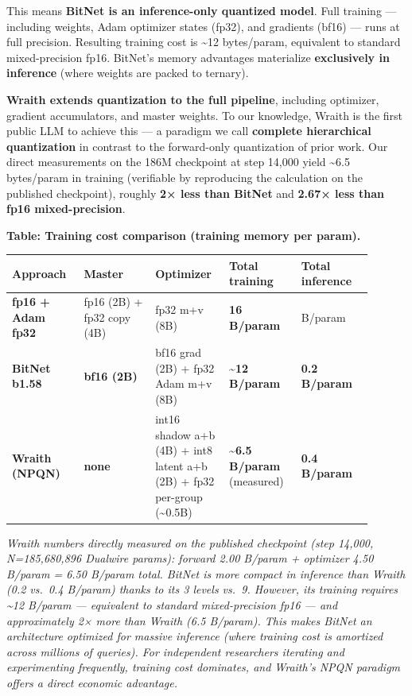This means \textbf{BitNet is an inference-only quantized model}. Full
training --- including weights, Adam optimizer states (fp32), and
gradients (bf16) --- runs at full precision. Resulting training cost is
\textasciitilde12 bytes/param, equivalent to standard mixed-precision
fp16. BitNet's memory advantages materialize \textbf{exclusively in
inference} (where weights are packed to ternary).

\textbf{Wraith extends quantization to the full pipeline}, including
optimizer, gradient accumulators, and master weights. To our knowledge,
Wraith is the first public LLM to achieve this --- a paradigm we call
\textbf{complete hierarchical quantization} in contrast to the
forward-only quantization of prior work. Our direct measurements on the
186M checkpoint at step 14,000 yield \textasciitilde6.5 bytes/param in
training (verifiable by reproducing the calculation on the published
checkpoint), roughly \textbf{2× less than BitNet} and \textbf{2.67× less
than fp16 mixed-precision}.

\textbf{Table: Training cost comparison (training memory per param).}

{\def\LTcaptype{none} %
{\footnotesize\setlength{\tabcolsep}{3pt}
\begin{longtable}[]{@{}>{\raggedright\arraybackslash}p{0.180\linewidth}>{\raggedright\arraybackslash}p{0.180\linewidth}>{\raggedright\arraybackslash}p{0.180\linewidth}>{\raggedright\arraybackslash}p{0.180\linewidth}>{\raggedright\arraybackslash}p{0.180\linewidth}@{}}
\toprule\noalign{}
Approach & Master & Optimizer & Total training & Total inference \\
\midrule\noalign{}
\endhead
\bottomrule\noalign{}
\endlastfoot
\textbf{fp16 + Adam fp32} & fp16 (2B) + fp32 copy (4B) & fp32 m+v (8B) &
\textbf{16 B/param} & 2 B/param \\
\textbf{BitNet b1.58} & \textbf{bf16 (2B)} & bf16 grad (2B) + fp32 Adam
m+v (8B) & \textbf{\textasciitilde12 B/param} & \textbf{0.2 B/param} \\
\textbf{Wraith (NPQN)} & \textbf{none} & int16 shadow a+b (4B) + int8
latent a+b (2B) + fp32 per-group (\textasciitilde0.5B) &
\textbf{\textasciitilde6.5 B/param} (measured) & \textbf{0.4 B/param} \\
\end{longtable}
}
}

\emph{Wraith numbers directly measured on the published checkpoint (step
14,000, N=185,680,896 Dualwire params): forward 2.00 B/param + optimizer
4.50 B/param = 6.50 B/param total. BitNet is more compact in inference
than Wraith (0.2 vs.~0.4 B/param) thanks to its 3 levels vs.~9. However,
its training requires \textasciitilde12 B/param --- equivalent to
standard mixed-precision fp16 --- and approximately 2× more than Wraith
(6.5 B/param). This makes BitNet an architecture optimized for massive
inference (where training cost is amortized across millions of queries).
For independent researchers iterating and experimenting frequently,
training cost dominates, and Wraith's NPQN paradigm offers a direct
economic advantage.}

